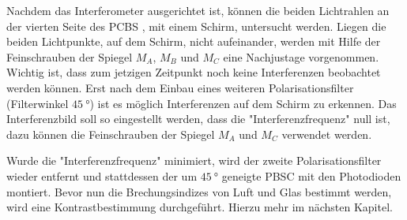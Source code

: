 Nachdem das Interferometer ausgerichtet ist, können die beiden Lichtrahlen an der vierten Seite des PCBS
, mit einem Schirm, untersucht werden.
Liegen die beiden Lichtpunkte, auf dem Schirm, nicht aufeinander, werden mit Hilfe der
Feinschrauben der Spiegel $M_A$, $M_B$ und $M_C$ eine Nachjustage vorgenommen. Wichtig ist, dass zum
jetzigen Zeitpunkt noch keine Interferenzen beobachtet werden können. Erst nach
dem Einbau eines weiteren Polarisationsfilter (Filterwinkel $\SI{45}{\degree}$)
ist es möglich Interferenzen auf dem Schirm zu erkennen.
Das Interferenzbild soll so eingestellt werden, dass die
"Interferenzfrequenz" null ist, dazu können die Feinschrauben der Spiegel
$M_A$ und $M_C$ verwendet werden.

Wurde die "Interferenzfrequenz" minimiert, wird der zweite Polarisationsfilter wieder
entfernt und stattdessen der um $\SI{45}{\degree}$ geneigte PBSC mit den Photodioden
montiert. Bevor nun die Brechungsindizes von Luft und Glas bestimmt werden, wird eine
Kontrastbestimmung durchgeführt. Hierzu mehr im nächsten Kapitel.

